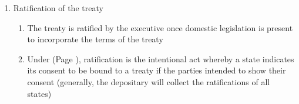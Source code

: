 \begin{enumerate}
\begin{enumerate}
\begin{enumerate}
        \end{enumerate}
        \item Ratification of the treaty
        \begin{enumerate}
            \item The treaty is ratified by the executive once domestic legislation is present to incorporate the terms of the treaty
            \item Under  (Page \pageref{VCLT Art 2}), ratification is the intentional act whereby a state indicates its consent to be bound to a treaty if the parties intended to show their consent (generally, the depositary will collect the ratifications of all states)
        \end{enumerate}
    \end{enumerate}
\end{enumerate}